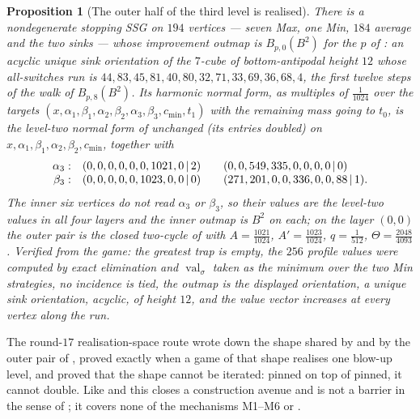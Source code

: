 \documentclass[11pt]{article}
\theoremstyle{plain}
\newtheorem{proposition}[theorem]{Proposition}
\theoremstyle{definition}
\DeclareMathOperator{\val}{val}
\begin{document}
\begin{proposition}[The outer half of the third level is realised]\label{prop:b3-outer}
There is a nondegenerate stopping SSG on $194$ vertices --- seven Max, one Min,
$184$ average and the two sinks --- whose improvement outmap is
$B_{p,0}(B^{2})$ for the $p$ of : an acyclic unique
sink orientation of the $7$-cube of bottom-antipodal height $12$ whose
all-switches run is
$44,83,45,81,40,80,32,71,33,69,36,68,4$, the first twelve steps of the walk of
$B_{p,8}(B^{2})$. Its harmonic normal form, as multiples of $\tfrac1{1024}$ over
the targets $(x,\alpha_1,\beta_1,\alpha_2,\beta_2,\alpha_3,\beta_3,c_{\min},t_1)$
with the remaining mass going to $t_0$, is the level-two normal form of
 unchanged (its entries doubled) on
$x,\alpha_1,\beta_1,\alpha_2,\beta_2,c_{\min}$, together with
\[
 \begin{array}{r@{\quad}l@{\qquad}l}
  \alpha_3: & (0,0,0,0,0,0,1021,0\,|\,2) & (0,0,549,335,0,0,0,0\,|\,0)\\
  \beta_3:  & (0,0,0,0,0,1023,0,0\,|\,0) & (271,201,0,0,336,0,0,88\,|\,1).
 \end{array}
\]
The inner six vertices do not read $\alpha_3$ or $\beta_3$, so their values are
the level-two values in all four layers and the inner outmap is $B^{2}$ on each;
on the layer $(0,0)$ the outer pair is the closed two-cycle of
 with $A=\tfrac{1021}{1024}$, $A'=\tfrac{1023}{1024}$,
$q=\tfrac1{512}$, $\Theta=\tfrac{2048}{4093}$. Verified from the game: the
greatest trap is empty, the $256$ profile values were computed by exact
elimination and $\val_\sigma$ taken as the minimum over the two Min strategies,
no incidence is tied, the outmap is the displayed orientation, a unique sink
orientation, acyclic, of height $12$, and the value vector increases at every
vertex along the run.
\end{proposition}

The round-$17$ realisation-space route wrote down the shape shared by
 and by the outer pair of , proved
exactly when a game of that shape realises one blow-up level, and proved
that the shape cannot be iterated: pinned on top of pinned, it cannot double.
Like  and  this closes a
construction avenue and is not a barrier in the sense of ; it
covers none of the mechanisms M1--M6 or .
\end{document}
